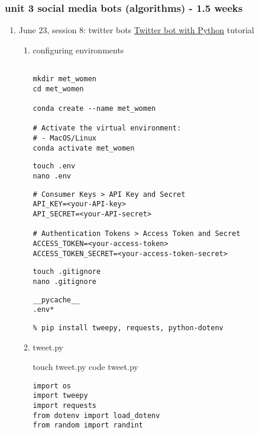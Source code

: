\documentclass[11pt]{article}
\begin{document}
\subsubsection{unit 3 social media bots (algorithms) - 1.5 weeks}
\label{sec:orgb4b3db9}
\begin{enumerate}
\item June 23, session 8: twitter bots
\label{sec:org4941e2c}
\href{https://thepythoncode.com/article/make-a-twitter-bot-in-python}{Twitter bot with Python} tutorial

\begin{enumerate}
\item configuring environments
\label{sec:orga38d0f9}

\begin{verbatim}

mkdir met_women
cd met_women

conda create --name met_women

# Activate the virtual environment:
# - MacOS/Linux
conda activate met_women

\end{verbatim}

\begin{verbatim}
touch .env
nano .env
\end{verbatim}

\begin{verbatim}
# Consumer Keys > API Key and Secret
API_KEY=<your-API-key>
API_SECRET=<your-API-secret>

# Authentication Tokens > Access Token and Secret
ACCESS_TOKEN=<your-access-token>
ACCESS_TOKEN_SECRET=<your-access-token-secret>
\end{verbatim}

\begin{verbatim}
touch .gitignore
nano .gitignore
\end{verbatim}

\begin{verbatim}
__pycache__
.env*
\end{verbatim}

\begin{verbatim}
% pip install tweepy, requests, python-dotenv
\end{verbatim}

\item tweet.py
\label{sec:org80ac483}

touch tweet.py
code tweet.py

\begin{verbatim}
import os
import tweepy
import requests
from dotenv import load_dotenv
from random import randint


\end{verbatim}
\end{enumerate}
\end{enumerate}
\end{document}
